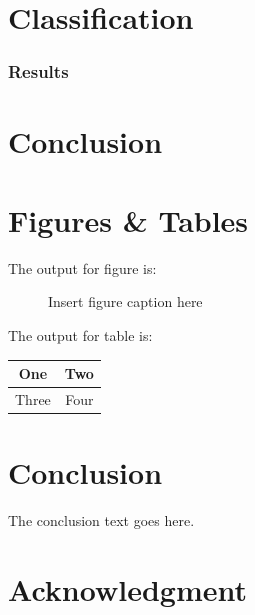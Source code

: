 \documentclass{IET}%
\begin{document}
\section{Classification}

\subsubsection{Results}

\section{Conclusion}

\section{Figures \& Tables}

The output for figure is:

\begin{figure}[!h]
\caption{Insert figure caption here
}
\label{fig_sim}
\end{figure}


\vskip2pc

\noindent The output for table is:

\begin{table}[!h]
{%
\begin{tabular}{|c||c|}%
\hline
One & Two\\ %
\hline
Three & Four\\%
\hline
\end{tabular}}{}
\end{table}%

\section{Conclusion}
The conclusion text goes here.

\section{Acknowledgment}
\end{document}
